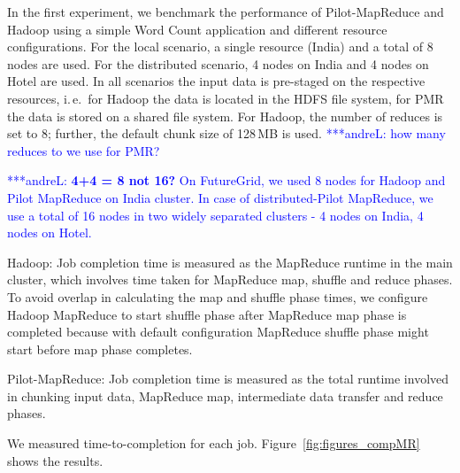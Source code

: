 \documentclass{acm_proc_article-sp}
\newcommand{\alnote}[1]{ {\textcolor{blue} { ***andreL: #1 }}}
\newcommand{\alnote}[1]{}
\newcommand{\pilotmapreduce}{Pilot-MapReduce\xspace}
\begin{document}
In the first experiment, we benchmark the performance of \pilotmapreduce and
Hadoop using a simple Word Count application and different resource
configurations. For the local scenario, a single resource (India)
and a total of 8 nodes are used. For the distributed scenario, 4 nodes on 
India and 4 nodes on Hotel are used. In all scenarios the input data is 
pre-staged on the respective resources, i.\,e.\ for Hadoop the data is located 
in the HDFS file system, for PMR the data is stored on a shared file system. 
For Hadoop, the number of reduces is set to 8; further, the default chunk size 
of 128\,MB is used.\alnote{how many reduces to we use for PMR?}


\alnote{\textbf{4+4 = 8 not 16?} On FutureGrid, we used 8 nodes for Hadoop and 
Pilot MapReduce on India cluster. In case of distributed-Pilot MapReduce, we 
use a total of 16 nodes in two widely separated clusters - 4 nodes on India, 4 
nodes on Hotel.}


Hadoop: Job completion time is measured as the MapReduce runtime in the main
cluster, which involves time taken for MapReduce map, shuffle and reduce
phases. To avoid overlap in calculating the map and shuffle phase times, we
configure Hadoop MapReduce to start shuffle phase after MapReduce map phase is
completed because with default configuration MapReduce shuffle phase might
start before map phase completes.

\pilotmapreduce: Job completion time is measured as the total runtime involved 
in chunking input data, MapReduce map, intermediate data transfer and reduce 
phases.

We measured time-to-completion for each job. Figure~\ref{fig:figures_compMR} 
shows the results.
\end{document}
